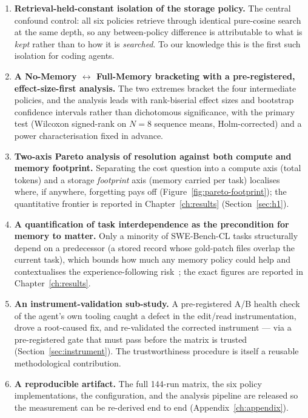 \begin{enumerate}
  \item \textbf{Retrieval-held-constant isolation of the storage policy.} The central
        confound control: all six policies retrieve through identical pure-cosine search
        at the same depth, so any between-policy difference is attributable to what is
        \emph{kept} rather than to how it is \emph{searched}. To our knowledge this is the
        first such isolation for coding agents.
  \item \textbf{A No-Memory $\leftrightarrow$ Full-Memory bracketing with a
        pre-registered, effect-size-first analysis.} The two extremes bracket the four
        intermediate policies, and the analysis leads with rank-biserial effect sizes and
        bootstrap confidence intervals rather than dichotomous significance, with the
        primary test (Wilcoxon signed-rank on $N=8$ sequence means, Holm-corrected) and a
        power characterisation fixed in advance.
  \item \textbf{Two-axis Pareto analysis of resolution against both compute and memory
        footprint.} Separating the cost question into a compute axis (total tokens) and a
        storage \emph{footprint} axis (memory carried per task) localises where, if
        anywhere, forgetting pays off (Figure~\ref{fig:pareto-footprint});
        the quantitative frontier is reported in Chapter~\ref{ch:results}
        (Section~\ref{sec:h1}).
  \item \textbf{A quantification of task interdependence as the precondition for memory to
        matter.} Only a minority of SWE-Bench-CL tasks
        structurally depend on a predecessor (a stored record whose gold-patch files
        overlap the current task), which bounds how much any memory policy could help and
        contextualises the experience-following risk~\cite{xiong2025}; the exact figures
        are reported in Chapter~\ref{ch:results}.
  \item \textbf{An instrument-validation sub-study.} A pre-registered A/B health check of
        the agent's own tooling caught a defect in the edit/read instrumentation, drove a
        root-caused fix, and re-validated the corrected instrument --- via a pre-registered
        gate that must pass before the matrix is trusted (Section~\ref{sec:instrument}). The
        trustworthiness procedure is itself a reusable methodological contribution.
  \item \textbf{A reproducible artifact.} The full 144-run matrix, the six policy
        implementations, the configuration, and the analysis pipeline are released so the
        measurement can be re-derived end to end (Appendix~\ref{ch:appendix}).
\end{enumerate}

